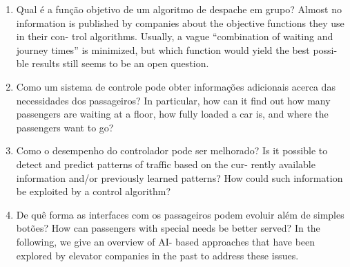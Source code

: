 \begin{enumerate}
\item Qual é a função objetivo de um algoritmo de despache em grupo? \hfill \newline
      Almost no information is published by companies about the objective functions they use in their con- trol algorithms. Usually, a vague “combination of waiting and journey times” is minimized, but which function would yield the best possi- ble results still seems to be an open question.

\item Como um sistema de controle pode obter informações adicionais acerca das necessidades dos passageiros?\hfill \newline
      In particular, how can it find out how many passengers are waiting at a floor, how fully loaded a car is, and where the passengers want to go?

\item Como o desempenho do controlador pode ser melhorado? \hfill \newline
      Is it possible to detect and predict patterns of traffic based on the cur- rently available information and/or previously learned patterns? How could such information be exploited by a control algorithm?

\item De quê forma as interfaces com os passageiros podem evoluir além de simples botões? \hfill \newline
      How can passengers with special needs be better served? In the following, we give an overview of AI- based approaches that have been explored by elevator companies in the past to address these issues.
\end{enumerate}



